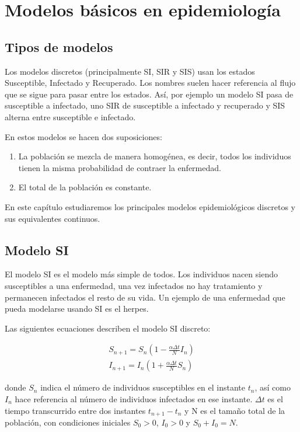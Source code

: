\chapter{Modelos básicos en epidemiología}

\section{Tipos de modelos}

Los modelos discretos (principalmente SI, SIR y SIS) usan los estados Susceptible, Infectado y Recuperado. Los nombres suelen hacer referencia al flujo que se sigue para pasar entre los estados. Así, por ejemplo un modelo SI pasa de susceptible a infectado, uno SIR de susceptible a infectado y recuperado y SIS alterna entre susceptible e infectado.

En estos modelos se hacen dos suposiciones:
\begin{enumerate}
\item La población se mezcla de manera homogénea, es decir, todos los individuos tienen la misma probabilidad de contraer la enfermedad.
\item El total de la población es constante.
\end{enumerate}

En este capítulo estudiaremos los principales modelos epidemiológicos discretos y sus equivalentes continuos.

\section{Modelo SI}
El modelo SI es el modelo más simple de todos. Los individuos nacen siendo susceptibles a una enfermedad, una vez infectados no hay tratamiento y permanecen infectados el resto de su vida.
Un ejemplo de una enfermedad que pueda modelarse usando SI es el herpes.

Las siguientes ecuaciones describen el modelo SI discreto:

\begin{equation}
\label{eqn: SI}
\begin{aligned}
S_{n+1}=S_n\left( 1-\frac{\alpha\Delta t}{N}I_n\right) \\
I_{n+1}=I_n\left( 1+\frac{\alpha\Delta t}{N}S_n\right)
\end{aligned}
\end{equation}

donde $S_n$ indica el número de individuos susceptibles en el instante $t_n$, así como $I_n$ hace referencia al número de individuos infectados en ese instante. $\Delta t$ es el tiempo transcurrido entre dos instantes $t_{n+1}-t_n$ y N es el tamaño total de la población, con condiciones iniciales $S_0>0$, $I_0>0$ y $S_0+I_0=N$.

